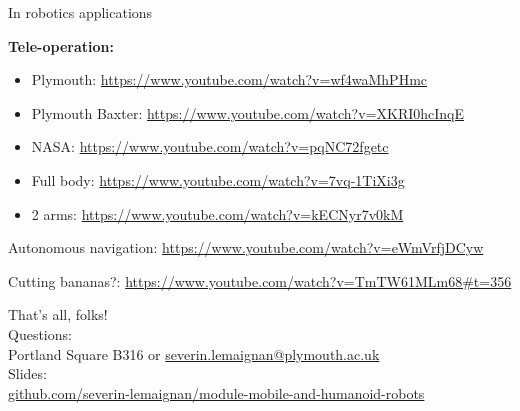 \documentclass[compress]{beamer}
\begin{document}
\begin{frame}{In robotics applications}

    \textbf{Tele-operation:}

    \begin{itemize}

        \item
              Plymouth: \url{https://www.youtube.com/watch?v=wf4waMhPHmc}
        \item
              Plymouth Baxter: \url{https://www.youtube.com/watch?v=XKRI0hcInqE}
        \item
              NASA: \url{https://www.youtube.com/watch?v=pqNC72fgetc}
        \item
              Full body: \url{https://www.youtube.com/watch?v=7vq-1TiXi3g}
        \item
              2 arms: \url{https://www.youtube.com/watch?v=kECNyr7v0kM}
    \end{itemize}

    Autonomous navigation: \url{https://www.youtube.com/watch?v=eWmVrfjDCyw}

    Cutting bananas?:
    \url{https://www.youtube.com/watch?v=TmTW61MLm68\#t=356}

\end{frame}


\begin{frame}{}
    \begin{center}
        \Large
        That's all, folks!\\[2em]
        \normalsize
        Questions:\\
        Portland Square B316 or \url{severin.lemaignan@plymouth.ac.uk} \\[1em]

        Slides:\\ \href{https://github.com/severin-lemaignan/module-mobile-and-humanoid-robots}{\small github.com/severin-lemaignan/module-mobile-and-humanoid-robots}

    \end{center}
\end{frame}
\end{document}
